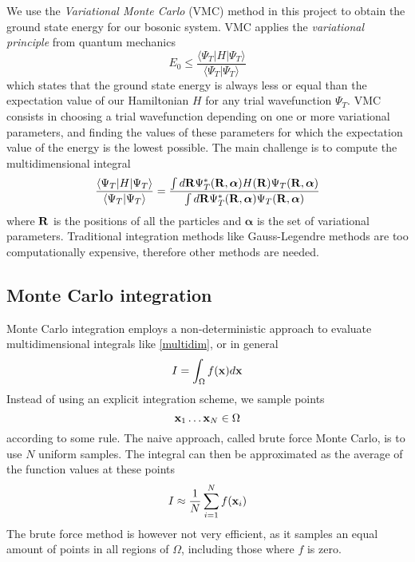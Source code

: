\documentclass[english, a4paper]{article}
\begin{document}
We use the \textit{Variational Monte Carlo} (VMC) method in this project to obtain the ground state energy
for our bosonic system. VMC applies the \textit{variational principle} from quantum mechanics
\begin{equation}
 E_0 \leq \frac{\langle \Psi_T | H | \Psi_T \rangle}{\langle \Psi_T | \Psi_T \rangle}
\end{equation}
which states that the ground state energy is always less or equal than the expectation value of our Hamiltonian $H$
for any trial wavefunction $\Psi_T$. VMC consists in choosing a trial wavefunction depending on one or more
variational parameters, and finding the values of these parameters for which the expectation value of the 
energy is the lowest possible. The main challenge is to compute the multidimensional integral
\begin{equation}
 \frac{\langle \Psi_T | H | \Psi_T \rangle}{\langle \Psi_T | \Psi_T \rangle} = 
 \frac{\int d {\bf R} \Psi_T^*({\bf R}, \boldsymbol{\alpha}) H({\bf R}) \Psi_T({\bf R}, \boldsymbol{\alpha})}
       {\int d {\bf R} \Psi_T^*({\bf R}, \boldsymbol{\alpha}) \Psi_T({\bf R}, \boldsymbol{\alpha})}
 \label{multidim}
\end{equation}
where $\bf{R}$ is the positions of all the particles and $\boldsymbol{\alpha}$ is the set of variational parameters.
Traditional integration methods like Gauss-Legendre methods are too computationally expensive, therefore 
other methods are needed.

\subsection{Monte Carlo integration}

Monte Carlo integration employs a non-deterministic approach to evaluate multidimensional integrals like \eqref{multidim}, or
in general
\begin{equation}
 I = \int_\Omega f({\bf x}) d{\bf x}
\end{equation}
Instead of using an explicit integration scheme, we sample points
\begin{equation}
 {\bf x}_1 \dots {\bf x}_N \in \Omega
\end{equation}
according to some rule. The naive approach, called brute force Monte Carlo, is to use $N$ uniform samples. 
The integral can then be approximated as the average of the function values at these points
\begin{equation}
 I \approx \frac{1}{N} \sum_{i=1}^N f({\bf x}_i)
\end{equation}
The brute force method is however not very efficient, as it samples an equal amount of points in all regions of $\Omega$, 
including those where $f$ is zero. 
\end{document}
